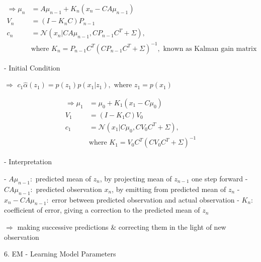       \begin{align}\displaystyle \Rightarrow \mu_n &= A\mu_{n-1}  + K_n (x_n - CA\mu_{n-1}) \\ V_n &= (I-K_nC) P_{n-1} \\ c_n &= \mathcal N(x_n| CA\mu_{n-1} , CP_{n-1}C^T + \Sigma), \\ & \text{where } K_n = P_{n-1}C^T(CP_{n-1}C^T+\Sigma)^{-1}, \text{ known as Kalman gain matrix} \end{align}

     - Initial Condition

       $\Rightarrow$ $c_1 \hat \alpha (z_1) = p(z_1) p(x_1|z_1), \text{ where } z_1 = p(x_1)$ 

       \begin{align} \displaystyle \Rightarrow \mu_1 &= \mu_0 +K_1 (x_1-C\mu_0) \\ V_1 &= (I-K_1C)V_0 \\ c_1 &= \mathcal N(x_1 |C \mu_0 , CV_0C^T + \Sigma), \\ & \text{where } K_1 = V_0 C^T (CV_0C^T + \Sigma)^{-1} \end{align}

   - Interpretation

     - $A\mu_{n-1}:$ predicted mean of $z_n$, by projecting mean of $z_{n-1}$ one step forward
     - $CA\mu_{n-1}:$ predicted observation $x_n$, by emitting from predicted mean of $z_n$  
     - $x_n-CA\mu_{n-1}:$ error between predicted observation and actual observation
     - $K_n:$ coefficient of error, giving a correction to the predicted mean of $z_{n}$ 

     $\Rightarrow$ making successive predictions \& correcting them in the light of new observation

6. EM - Learning Model Parameters